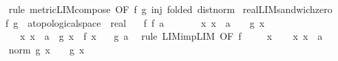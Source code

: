 \begin{isabellebody}
%
\isadelimproof
\ \ %
\endisadelimproof
%
\isatagproof
{}\isamarkupfalse%
\ {\isacharparenleft}{\kern0pt}rule\ metric{\isacharunderscore}{\kern0pt}LIM{\isacharunderscore}{\kern0pt}compose{}\ {\isacharbrackleft}{\kern0pt}OF\ f\ g\ inj\ {\isacharbrackleft}{\kern0pt}folded\ dist{\isacharunderscore}{\kern0pt}norm{\isacharbrackright}{\kern0pt}{\isacharbrackright}{\kern0pt}{\isacharparenright}{\kern0pt}%
\endisatagproof
{\isafoldproof}%
%
\isadelimproof
\isanewline
%
\endisadelimproof
\isanewline
{}\isamarkupfalse%
\ real{\isacharunderscore}{\kern0pt}LIM{\isacharunderscore}{\kern0pt}sandwich{\isacharunderscore}{\kern0pt}zero{\isacharcolon}{\kern0pt}\isanewline
\ \ \ f\ g\ {\isacharcolon}{\kern0pt}{\isacharcolon}{\kern0pt}\ {\isachardoublequoteopen}{\isacharprime}{\kern0pt}a{\isacharcolon}{\kern0pt}{\isacharcolon}{\kern0pt}topological{\isacharunderscore}{\kern0pt}space\ {\isasymRightarrow}\ real{\isachardoublequoteclose}\isanewline
\ \ \ f{\isacharcolon}{\kern0pt}\ {\isachardoublequoteopen}f\ {\isasymmidarrow}a{\isasymrightarrow}\ {}{\isachardoublequoteclose}\isanewline
\ \ \ \ \ {}{\isacharcolon}{\kern0pt}\ {\isachardoublequoteopen}{\isasymAnd}x{\isachardot}{\kern0pt}\ x\ {\isasymnoteq}\ a\ {\isasymLongrightarrow}\ {}\ {\isasymle}\ g\ x{\isachardoublequoteclose}\isanewline
\ \ \ \ \ {}{\isacharcolon}{\kern0pt}\ {\isachardoublequoteopen}{\isasymAnd}x{\isachardot}{\kern0pt}\ x\ {\isasymnoteq}\ a\ {\isasymLongrightarrow}\ g\ x\ {\isasymle}\ f\ x{\isachardoublequoteclose}\isanewline
\ \ \ {\isachardoublequoteopen}g\ {\isasymmidarrow}a{\isasymrightarrow}\ {}{\isachardoublequoteclose}\isanewline
%
\isadelimproof
%
\endisadelimproof
%
\isatagproof
{}\isamarkupfalse%
\ {\isacharparenleft}{\kern0pt}rule\ LIM{\isacharunderscore}{\kern0pt}imp{\isacharunderscore}{\kern0pt}LIM\ {\isacharbrackleft}{\kern0pt}OF\ f{\isacharbrackright}{\kern0pt}{\isacharparenright}{\kern0pt}\ \isanewline
\ \ \isamarkupfalse%
\ x\isanewline
\ \ \isamarkupfalse%
\ x{\isacharcolon}{\kern0pt}\ {\isachardoublequoteopen}x\ {\isasymnoteq}\ a{\isachardoublequoteclose}\isanewline
\ \ \isamarkupfalse%
\ {}\ \isamarkupfalse%
\ {\isachardoublequoteopen}norm\ {\isacharparenleft}{\kern0pt}g\ x\ {\isacharminus}{\kern0pt}\ {}{\isacharparenright}{\kern0pt}\ {\isacharequal}{\kern0pt}\ g\ x{\isachardoublequoteclose}\ \isamarkupfalse%

\end{isabellebody}
